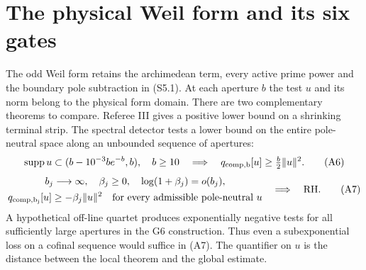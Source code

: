 \documentclass[
  10pt,
  a4paper,
  10pt,
  oneside,
  openany]{book}
\begin{document}
\section{The physical Weil form and its six gates}\label{atlas-physical}

The odd Weil form retains the archimedean term, every active prime power
and the boundary pole subtraction in (S5.1). At each aperture \(b\) the
test \(u\) and its norm belong to the physical form domain. There are
two complementary theorems to compare. Referee III gives a positive
lower bound on a shrinking terminal strip. The spectral detector tests a
lower bound on the entire pole-neutral space along an unbounded sequence
of apertures: \[
 \operatorname{supp}u\subset(b-10^{-3}b e^{-b},b),\quad b\ge10
 \quad\Longrightarrow\quad q_{\rm comp,b}[u]\ge\tfrac b2\|u\|^2 .
 \tag{A6}\label{eq:A6}
\] \[
 \begin{gathered}
 b_j\longrightarrow\infty,\quad \beta_j\ge0,\quad\log(1+\beta_j)=o(b_j),\\
 q_{\rm comp,b_j}[u]\ge-\beta_j\|u\|^2
 \quad\text{for every admissible pole-neutral }u
 \end{gathered}
 \quad\Longrightarrow\quad{\rm RH}.
 \tag{A7}\label{eq:A7}
\] A hypothetical off-line quartet produces exponentially negative tests
for all sufficiently large apertures in the G6 construction. Thus even a
subexponential loss on a cofinal sequence would suffice in (A7). The
quantifier on \(u\) is the distance between the local theorem and the
global estimate.
\end{document}
